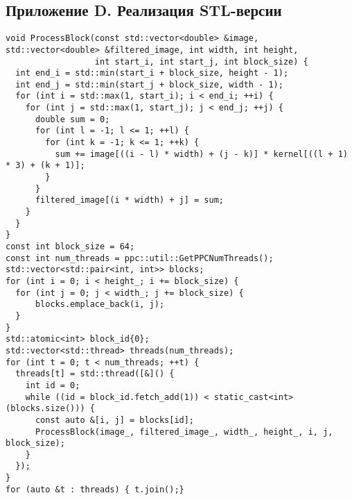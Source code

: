 \documentclass[14pt, a4paper]{extarticle}
\begin{document}
\newpage

\subsection*{Приложение D. Реализация STL-версии}
\begin{lstlisting}
void ProcessBlock(const std::vector<double> &image, std::vector<double> &filtered_image, int width, int height,
                  int start_i, int start_j, int block_size) {
  int end_i = std::min(start_i + block_size, height - 1);
  int end_j = std::min(start_j + block_size, width - 1);
  for (int i = std::max(1, start_i); i < end_i; ++i) {
    for (int j = std::max(1, start_j); j < end_j; ++j) {
      double sum = 0;
      for (int l = -1; l <= 1; ++l) {
        for (int k = -1; k <= 1; ++k) {
          sum += image[((i - l) * width) + (j - k)] * kernel[((l + 1) * 3) + (k + 1)];
        }
      }
      filtered_image[(i * width) + j] = sum;
    }
  }
}
const int block_size = 64;
const int num_threads = ppc::util::GetPPCNumThreads();
std::vector<std::pair<int, int>> blocks;
for (int i = 0; i < height_; i += block_size) {
  for (int j = 0; j < width_; j += block_size) {
      blocks.emplace_back(i, j);
  }
}
std::atomic<int> block_id{0};
std::vector<std::thread> threads(num_threads);
for (int t = 0; t < num_threads; ++t) {
  threads[t] = std::thread([&]() {
    int id = 0;
    while ((id = block_id.fetch_add(1)) < static_cast<int>(blocks.size())) {
      const auto &[i, j] = blocks[id];
      ProcessBlock(image_, filtered_image_, width_, height_, i, j, block_size);
    }
  });
}
for (auto &t : threads) { t.join();}
\end{lstlisting}

\newpage
\end{document}
